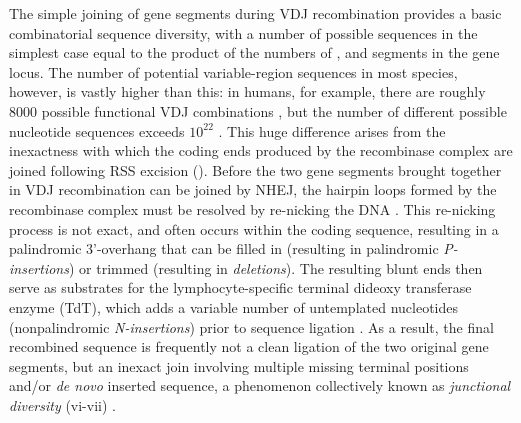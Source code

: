 The simple joining of gene segments during VDJ recombination provides a basic combinatorial sequence diversity, with a number of possible sequences in the simplest case equal to the product of the numbers of \vh, \dh and \jh segments in the \igh{} gene locus. The number of potential \igh{} variable-region sequences in most species, however, is vastly higher than this: in humans, for example, there are roughly 8000 possible functional VDJ combinations \parencite{lefranc2001humanheavy}, but the number of different possible nucleotide sequences exceeds $10^{22}$ \parencite{elhanati2015model}. This huge difference arises from the inexactness with which the coding ends produced by the recombinase complex are joined following RSS excision (). Before the two gene segments brought together in VDJ recombination can be joined by NHEJ, the hairpin loops formed by the recombinase complex must be resolved by re-nicking the DNA \parencite{schroeder2010immunoglobulins,schatz2011vdjr}. This re-nicking process is not exact, and often occurs within the coding sequence, resulting in a palindromic 3'-overhang that can be filled in (resulting in palindromic \textit{P-insertions}) or trimmed (resulting in \textit{deletions}). The resulting blunt ends then serve as substrates for the lymphocyte-specific terminal dideoxy transferase enzyme (TdT), which adds a variable number of untemplated nucleotides (nonpalindromic \textit{N-insertions}) prior to sequence ligation \parencite{schroeder2010immunoglobulins,schatz2011vdjr}. As a result, the final recombined sequence is frequently not a clean ligation of the two original gene segments, but an inexact join involving multiple missing terminal positions and/or \textit{de novo} inserted sequence, a phenomenon collectively known as \textit{junctional diversity} (vi-vii) \parencite{flaherty2012chapter}.

